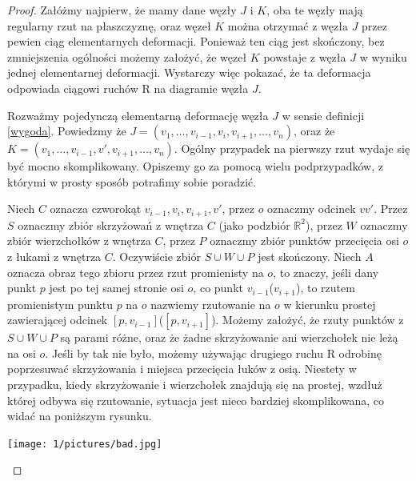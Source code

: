 \begin{proof}

Załóżmy najpierw, że mamy dane węzły $J$ i $K$, oba te węzły mają regularny rzut na płaszczyznę, oraz węzeł $K$ można otrzymać z węzła $J$ przez pewien ciąg elementarnych deformacji.
Ponieważ ten ciąg jest skończony, bez zmniejszenia ogólności możemy założyć, że węzeł $K$ powstaje z węzła $J$ w wyniku jednej elementarnej deformacji. Wystarczy więc pokazać, że 
ta deformacja odpowiada ciągowi ruchów R na diagramie węzła $J$. 

Rozważmy pojedynczą elementarną deformację węzła $J$ w sensie definicji \ref{wygoda}. Powiedzmy że $J = (v_1, \ldots, v_{i-1}, v_i, v_{i+1}, \ldots, v_n)$, oraz że 
$K = (v_1, \ldots, v_{i-1}, v', v_{i+1}, \ldots, v_n)$. Ogólny przypadek na pierwszy rzut wydaje się być mocno skomplikowany. Opiszemy go za pomocą wielu podprzypadków, z którymi
w prosty sposób potrafimy sobie poradzić. 

Niech $C$ oznacza czworokąt $v_{i-1}, v_i, v_{i+1}, v'$, przez $o$ oznaczmy odcinek $vv'$. Przez $S$ oznaczmy zbiór skrzyżowań z wnętrza $C$ (jako podzbiór $\mathbb{R}^2$), 
przez $W$ oznaczmy zbiór wierzchołków z wnętrza $C$, przez $P$ oznaczmy zbiór punktów przecięcia osi $o$ z łukami z wnętrza $C$. 
Oczywiście zbiór $S\cup W\cup P$ jest skończony. Niech $A$ oznacza obraz tego zbioru przez rzut promienisty na $o$, to znaczy, jeśli dany punkt $p$ jest po tej samej stronie osi $o$, 
co punkt $v_{i-1}$($v_{i+1}$), to rzutem promienistym punktu $p$ na $o$ nazwiemy rzutowanie na $o$ w kierunku prostej zawierającej odcinek $[p, v_{i-1}]$($[p, v_{i+1}]$). 
Możemy założyć, że rzuty punktów z $S\cup W\cup P$ są parami różne, oraz że żadne skrzyżowanie ani wierzchołek nie leżą na osi $o$.
Jeśli by tak nie było, możemy używając drugiego ruchu R odrobinę poprzesuwać skrzyżowania i miejsca przecięcia łuków z osią. 
Niestety w przypadku, kiedy skrzyżowanie i wierzchołek znajdują się na prostej, wzdłuż której odbywa się rzutowanie, sytuacja jest nieco bardziej skomplikowana, co widać na poniższym
rysunku.



	\begin{center}

	\texttt{[image: 1/pictures/bad.jpg]}
	\end{center}



\end{proof}
